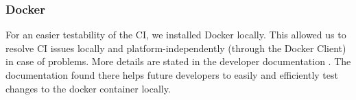 \subsubsection{Docker}
For an easier testability of the CI, we installed Docker locally.
This allowed us to resolve CI issues locally and platform-independently (through the Docker Client) in case of problems.
More details are stated in the developer documentation \cite{dev}.
The documentation found there helps future developers to easily and efficiently test changes to the docker container locally. \\
